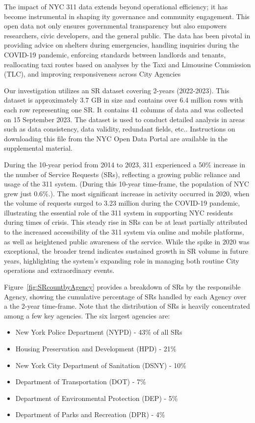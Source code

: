 \documentclass[linenumber]{jdsart}
\begin{document}
The impact of NYC 311 data extends beyond operational efficiency; it
has become instrumental in shaping ity governance and community
engagement. This open data not only ensures governmental transparency
but also empowers researchers, civic developers, and the general
public. The data has been pivotal in providing advice on shelters
during emergencies, handling inquiries during the COVID\mbox{-}19 pandemic,
enforcing standards between landlords and tenants, reallocating taxi
routes based on analyses by the Taxi and Limousine Commission (TLC),
and improving responsiveness across City Agencies


Our investigation utilizes an SR dataset covering  2\mbox{-}years (2022-2023).
This dataset is approximately 3.7 GB in size and contains over 
6.4 million rows with each row representing one SR. It contains 
41 columns of data and was collected on 15 September 2023. The 
dataset is used to conduct detailed analysis 
in areas such as data consistency, data validity, redundant fields, 
etc.. Instructions on downloading this file from the 
NYC Open Data Portal are available in the supplemental material.


During the 10\mbox{-}year period from 2014 to 2023,  311 experienced
a 50\% increase in the number of Service Requests (SRs), 
reflecting a growing public reliance and usage of 
the 311 system. (During this 10\mbox{-}year time-frame, the 
population of NYC grew just 0.6\%.). The most significant increase
in activity occurred in 2020, when the volume of requests 
surged to 3.23 million during the COVID\mbox{-}19 pandemic, 
illustrating the essential role of the 311 system in supporting 
NYC residents during times of crisis. This steady 
rise in SRs can be at least partially attributed to the increased 
accessibility of the 311 system via online and mobile 
platforms, as well as heightened public awareness of the service. 
While the spike in 2020 was exceptional, the broader trend 
indicates sustained growth in SR volume in future years,  
highlighting the system's expanding role in managing 
both routine City operations and extraordinary events.


Figure~\ref{fig:SRcountbyAgency} provides a breakdown of SRs by
the responsible Agency, showing the cumulative 
percentage of SRs handled by each
Agency over a the 2\mbox{-}year time-frame. Note that the
distribution of SRs is heavily concentrated among a few key 
agencies. The six largest agencies are:

\begin{itemize}
    \item New York Police Department (NYPD) - 43\% of all SRs
    \item Housing Preservation and Development (HPD) - 21\%
    \item New York City Department of Sanitation (DSNY) - 10\%
    \item Department of Transportation (DOT) - 7\%
    \item Department of Environmental Protection (DEP) - 5\%
    \item Department of Parks and Recreation (DPR) - 4\%
\end{itemize}
\end{document}
